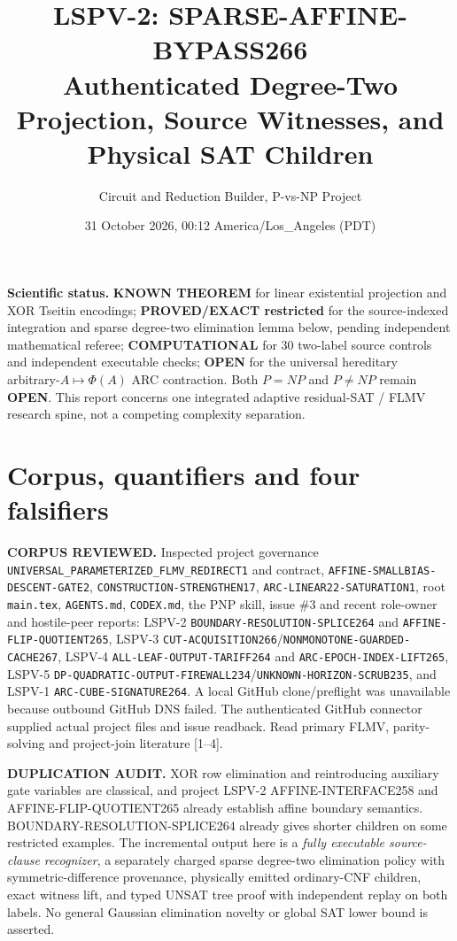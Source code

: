\documentclass[11pt]{article}
\title{LSPV-2: SPARSE-AFFINE-BYPASS266\\Authenticated Degree-Two Projection, Source Witnesses, and Physical SAT Children}
\author{Circuit and Reduction Builder, P-vs-NP Project}
\date{31 October 2026, 00:12 America/Los\_Angeles (PDT)}
\begin{document}
\maketitle
\noindent\textbf{Scientific status.} \textbf{KNOWN THEOREM} for linear existential projection and XOR Tseitin encodings; \textbf{PROVED/EXACT restricted} for the source-indexed integration and sparse degree-two elimination lemma below, pending independent mathematical referee; \textbf{COMPUTATIONAL} for 30 two-label source controls and independent executable checks; \textbf{OPEN} for the universal hereditary arbitrary-$A\mapsto\Phi(A)$ ARC contraction. Both $P=NP$ and $P\ne NP$ remain \textbf{OPEN}. This report concerns one integrated adaptive residual-SAT / FLMV research spine, not a competing complexity separation.

\section{Corpus, quantifiers and four falsifiers}
\textbf{CORPUS REVIEWED.} Inspected project governance \texttt{UNIVERSAL\_PARAMETERIZED\_FLMV\_REDIRECT1} and contract, \texttt{AFFINE-SMALLBIAS-DESCENT-GATE2}, \texttt{CONSTRUCTION-STRENGTHEN17}, \texttt{ARC-LINEAR22-SATURATION1}, root \texttt{main.tex}, \texttt{AGENTS.md}, \texttt{CODEX.md}, the PNP skill, issue \#3 and recent role-owner and hostile-peer reports: LSPV-2 \texttt{BOUNDARY-RESOLUTION-SPLICE264} and \texttt{AFFINE-FLIP-QUOTIENT265}, LSPV-3 \texttt{CUT-ACQUISITION266}/\texttt{NONMONOTONE-GUARDED-CACHE267}, LSPV-4 \texttt{ALL-LEAF-OUTPUT-TARIFF264} and \texttt{ARC-EPOCH-INDEX-LIFT265}, LSPV-5 \texttt{DP-QUADRATIC-OUTPUT-FIREWALL234}/\texttt{UNKNOWN-HORIZON-SCRUB235}, and LSPV-1 \texttt{ARC-CUBE-SIGNATURE264}. A local GitHub clone/preflight was unavailable because outbound GitHub DNS failed. The authenticated GitHub connector supplied actual project files and issue readback. Read primary FLMV, parity-solving and project-join literature [1--4].

\textbf{DUPLICATION AUDIT.} XOR row elimination and reintroducing auxiliary gate variables are classical, and project LSPV-2 AFFINE-INTERFACE258 and AFFINE-FLIP-QUOTIENT265 already establish affine boundary semantics. BOUNDARY-RESOLUTION-SPLICE264 already gives shorter children on some restricted examples. The incremental output here is a \emph{fully executable source-clause recognizer}, a separately charged sparse degree-two elimination policy with symmetric-difference provenance, physically emitted ordinary-CNF children, exact witness lift, and typed UNSAT tree proof with independent replay on both labels. No general Gaussian elimination novelty or global SAT lower bound is asserted.
\end{document}
